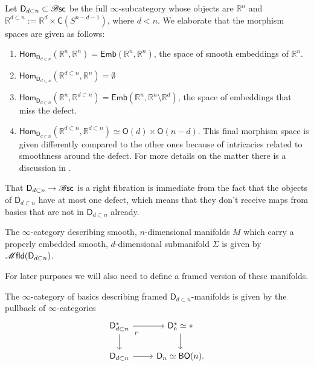 \documentclass[../text]{subfiles}
\begin{document}
\begin{construction}
    Let $\mathsf{D}_{d \subset n} \subset \mathscr{B} \mathsf{sc}$ be the full $\infty$-subcategory whose objects are $\mathbb{R}^n$ and $\mathbb{R}^{d \subset n} := \mathbb{R}^{d} \times \mathsf{C}(S^{n-d-1})$, where $d < n$. We elaborate that the morphism spaces are given as follows:
    \begin{enumerate}
        \item $\mathsf{Hom}_{\mathsf{D}_{d \subset n}} (\mathbb{R}^n, \mathbb{R}^n) = \mathsf{Emb}(\mathbb{R}^n, \mathbb{R}^n)$, the space of smooth embeddings of $\mathbb{R}^n$.
        \item $\mathsf{Hom}_{\mathsf{D}_{d \subset n}} (\mathbb{R}^{d \subset n}, \mathbb{R}^n) = \emptyset$
        \item $\mathsf{Hom}_{\mathsf{D}_{d \subset n}} (\mathbb{R}^n, \mathbb{R}^{d \subset n}) = \mathsf{Emb}(\mathbb{R}^n, \mathbb{R}^n \setminus \mathbb{R}^d)$, the space of embeddings that miss the defect.
        \item $\mathsf{Hom}_{\mathsf{D}_{d \subset n}} (\mathbb{R}^{d \subset n}, \mathbb{R}^{d \subset n}) \simeq \mathsf{O}(d) \times \mathsf{O}(n-d)$. This final morphism space is given differently compared to the other ones because of intricacies related to smoothness around the defect. For more details on the matter there is a discussion in \cite[Example 5.1.7]{aft_localstrut}.
    \end{enumerate}
    That $\mathsf{D}_{d \subset n} \rightarrow \mathscr{B} \mathsf{sc}$ is a right fibration is immediate from the fact that the objects of $\mathsf{D}_{d \subset n}$ have at most one defect, which means that they don't receive maps from basics that are not in $\mathsf{D}_{d \subset n}$ already.
\end{construction}

\begin{definition}\label{def:mfld_disk_dn}
    The $\infty$-category describing smooth, $n$-dimensional manifolds $M$ which carry a properly embedded smooth, $d$-dimensional submanifold $\Sigma$ is given by $\mfld(\mathsf{D}_{d \subset n})$.
\end{definition}

For later purposes we will also need to define a framed version of these manifolds.

\begin{definition}\label{def:framed_d_under_n_structure}
    The $\infty$-category of basics describing framed $\mathsf{D}_{d \subset n}$-manifolds is given by the pullback of $\infty$-categories
    \begin{equation}
        \begin{tikzcd}
            \mathsf{D}_{d \subset n}^* \arrow[dr, phantom, "\ulcorner", very near start] \arrow[r] \arrow[d] & \mathsf{D_n^*} \simeq * \arrow[d] \\
            \mathsf{D}_{d \subset n} \arrow[r] & \mathsf{D}_n \simeq \mathsf{BO}(n).
        \end{tikzcd}
    \end{equation}
\end{definition}
\end{document}
